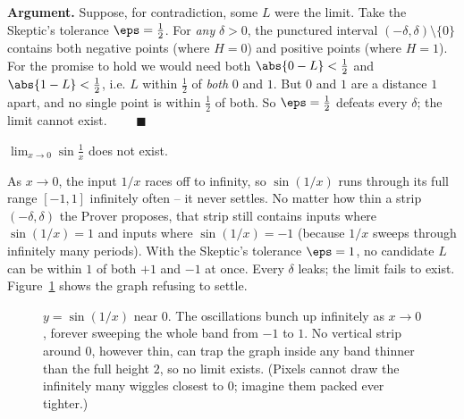 \textbf{Argument.} Suppose, for contradiction, some $L$ were the limit. Take the
Skeptic's tolerance $\eps=\tfrac12$. For \emph{any} $\delta>0$, the punctured
interval $(-\delta,\delta)\setminus\{0\}$ contains both negative points (where
$H=0$) and positive points (where $H=1$). For the promise to hold we would need
both $\abs{0-L}<\tfrac12$ and $\abs{1-L}<\tfrac12$, i.e. $L$ within $\tfrac12$ of
\emph{both} $0$ and $1$. But $0$ and $1$ are a distance $1$ apart, and no single
point is within $\tfrac12$ of both. So $\eps=\tfrac12$ defeats every $\delta$;
the limit cannot exist. $\qquad\blacksquare$

\begin{example}
\label{ch06:ex-sin}
$\displaystyle\lim_{x\to 0}\sin\!\frac{1}{x}$ does not exist.
\end{example}

As $x\to0$, the input $1/x$ races off to infinity, so $\sin(1/x)$ runs through
its full range $[-1,1]$ infinitely often -- it never settles. No matter how thin
a strip $(-\delta,\delta)$ the Prover proposes, that strip still contains inputs
where $\sin(1/x)=1$ and inputs where $\sin(1/x)=-1$ (because $1/x$ sweeps through
infinitely many periods). With the Skeptic's tolerance $\eps=1$, no candidate $L$
can be within $1$ of both $+1$ and $-1$ at once. Every $\delta$ leaks; the limit
fails to exist. Figure~\ref{ch06:fig-sin} shows the graph refusing to settle.

\begin{figure}[H]
\centering
{}
\caption{$y=\sin(1/x)$ near $0$. The oscillations bunch up infinitely as $x\to0$,
forever sweeping the whole band from $-1$ to $1$. No vertical strip around $0$,
however thin, can trap the graph inside any band thinner than the full height
$2$, so no limit exists. (Pixels cannot draw the infinitely many wiggles closest
to $0$; imagine them packed ever tighter.)}
\label{ch06:fig-sin}
\end{figure}


